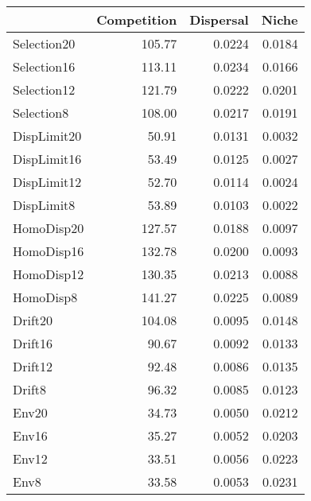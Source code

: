 \begin{longtable}{l|rrr}
\toprule
\multicolumn{1}{l}{} & Competition & Dispersal & Niche \\ 
\midrule
Selection20 & 105.77 & 0.0224 & 0.0184 \\ 
Selection16 & 113.11 & 0.0234 & 0.0166 \\ 
Selection12 & 121.79 & 0.0222 & 0.0201 \\ 
Selection8 & 108.00 & 0.0217 & 0.0191 \\ 
DispLimit20 & 50.91 & 0.0131 & 0.0032 \\ 
DispLimit16 & 53.49 & 0.0125 & 0.0027 \\ 
DispLimit12 & 52.70 & 0.0114 & 0.0024 \\ 
DispLimit8 & 53.89 & 0.0103 & 0.0022 \\ 
HomoDisp20 & 127.57 & 0.0188 & 0.0097 \\ 
HomoDisp16 & 132.78 & 0.0200 & 0.0093 \\ 
HomoDisp12 & 130.35 & 0.0213 & 0.0088 \\ 
HomoDisp8 & 141.27 & 0.0225 & 0.0089 \\ 
Drift20 & 104.08 & 0.0095 & 0.0148 \\ 
Drift16 & 90.67 & 0.0092 & 0.0133 \\ 
Drift12 & 92.48 & 0.0086 & 0.0135 \\ 
Drift8 & 96.32 & 0.0085 & 0.0123 \\ 
Env20 & 34.73 & 0.0050 & 0.0212 \\ 
Env16 & 35.27 & 0.0052 & 0.0203 \\ 
Env12 & 33.51 & 0.0056 & 0.0223 \\ 
Env8 & 33.58 & 0.0053 & 0.0231 \\ 
\bottomrule
\end{longtable}

